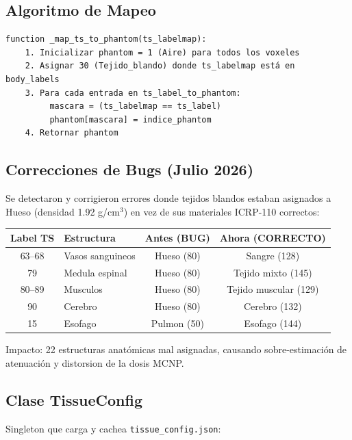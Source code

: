 \documentclass[12pt,a4paper]{article}
\begin{document}
\subsection{Algoritmo de Mapeo}

\begin{lstlisting}
function _map_ts_to_phantom(ts_labelmap):
    1. Inicializar phantom = 1 (Aire) para todos los voxeles
    2. Asignar 30 (Tejido_blando) donde ts_labelmap está en body_labels
    3. Para cada entrada en ts_label_to_phantom:
         mascara = (ts_labelmap == ts_label)
         phantom[mascara] = indice_phantom
    4. Retornar phantom
\end{lstlisting}

\subsection{Correcciones de Bugs (Julio 2026)}

Se detectaron y corrigieron errores donde tejidos blandos estaban asignados a Hueso (densidad
1.92 g/cm$^3$) en vez de sus materiales ICRP-110 correctos:

\begin{table}[H]
\centering
\begin{tabular}{c l c c}
\toprule
\textbf{Label TS} & \textbf{Estructura} & \textbf{Antes (BUG)} & \textbf{Ahora (CORRECTO)} \\
\midrule
63--68 & Vasos sanguineos & Hueso (80) & Sangre (128) \\
79 & Medula espinal & Hueso (80) & Tejido mixto (145) \\
80--89 & Musculos & Hueso (80) & Tejido muscular (129) \\
90 & Cerebro & Hueso (80) & Cerebro (132) \\
15 & Esofago & Pulmon (50) & Esofago (144) \\
\bottomrule
\end{tabular}
\end{table}

Impacto: 22 estructuras anatómicas mal asignadas, causando sobre-estimación de atenuación y
distorsion de la dosis MCNP.

\subsection{Clase TissueConfig}

Singleton que carga y cachea \texttt{tissue\_config.json}:
\end{document}
